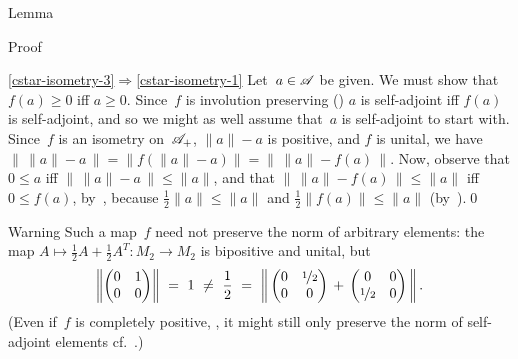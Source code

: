 \documentclass[a]{subfiles}
\begin{document}
\begin{parsec}
\begin{point}{Lemma}
\begin{point}{Proof}
\begin{point}{\ref{cstar-isometry-3}$\Longrightarrow$\ref{cstar-isometry-1}}
Let~$a\in \mathscr{A}$ be given.
We must show that~$f(a)\geq 0$ iff $a\geq 0$.
Since~$f$ is involution preserving ()
$a$ is self-adjoint iff $f(a)$ is self-adjoint,
and so we might as well assume that~$a$ is self-adjoint
to start with.
Since~$f$ is an isometry on~$\mathscr{A}_+$,
$\|a\|-a$ is positive,
and $f$ is unital,
we have $\|\,\|a\|-a\,\|=\|f(\|a\|-a)\|=\|\,\|a\|-f(a)\,\|$.
Now,
observe that
$0\leq a$
iff
$ \|\,\|a\|-a\,\|\leq \|a\|$,
and that
$\|\,\|a\|-f(a)\,\|\leq \|a\|$ 
iff $0\leq f(a)$,
by~,
because $\frac{1}{2}\|a\|\leq \|a\|$
and $\frac{1}{2}\|f(a)\|\leq  \|a\|$
(by~).\qed
\end{point}
\end{point}
\begin{point}{Warning}%
Such a map~$f$ need not preserve the norm of arbitrary elements:
the map $A\mapsto \frac{1}{2}A+\frac{1}{2}A^T\colon M_2\to M_2$
is bipositive and unital,
but
\begin{equation*}
\left\|\left(\begin{matrix}0&1\\0&0\end{matrix}
\right)\right\|
\ = \ 1 \ \neq \ \frac{1}{2}\ = \ 
\left\|\,\left(\begin{matrix}0 & \nicefrac{1}{2} \\ 0 & 0
\end{matrix}\right)
\,+\,\left(\begin{matrix}0 & 0\\ \nicefrac{1}{2} & 0
\end{matrix}\right)\,\right\|.
\end{equation*}
(Even if~$f$ is completely positive, ,
it might still only preserve the norm of self-adjoint elements
cf.~.)
\end{point}
\end{point}
\end{parsec}
\end{document}
